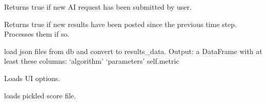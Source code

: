 \documentclass[letterpaper,10pt,english]{sphinxmanual}
\begin{document}
\begin{fulllineitems}
\begin{quote}
\begin{description}
\begin{itemize}
\end{itemize}

\end{description}\end{quote}

\begin{fulllineitems}
\label{\detokenize{index:ai.ai.AI.check_requests}}
Returns true if new AI request has been submitted by user.

\end{fulllineitems}


\begin{fulllineitems}
\label{\detokenize{index:ai.ai.AI.check_results}}
Returns true if new results have been posted since the previous
time step. Processes them if so.

\end{fulllineitems}


\begin{fulllineitems}
\label{\detokenize{index:ai.ai.AI.db_to_results_data}}
load json files from db and convert to results\_data.
Output: a DataFrame with at least these columns:
‘algorithm’
‘parameters’
self.metric

\end{fulllineitems}


\begin{fulllineitems}
\label{\detokenize{index:ai.ai.AI.load_options}}
Loads UI options.

\end{fulllineitems}


\begin{fulllineitems}
\label{\detokenize{index:ai.ai.AI.load_state}}
loads pickled score file.

\end{fulllineitems}


\end{fulllineitems}
\end{document}

